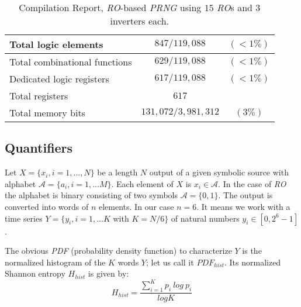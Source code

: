 \begin{table}
\begin{center}
\begin{tabular}{| l | c  c | }
 \hline
 
\footnotesize{Total logic elements} & $847/119,088$ & $ ( < 1 \%)$\\

 \hline
 
\footnotesize{Total combinational functions} &  $629/119,088$ & $( < 1 \%)$ \\

 \hline
 
\footnotesize{Dedicated logic registers} & $617/119,088$ & $( < 1 \%)$ \\

 \hline
 
\footnotesize{Total registers} &  $617$ &   \\

 \hline
 
\footnotesize{Total memory bits} &  $131,072/3,981,312$ & $( 3 \%)$ \\

 \hline
 
\end{tabular}
\end{center}
\caption{Compilation Report, \emph{RO}-based \emph{PRNG} using $15$ \emph{RO}s and $3$ inverters each.}
\label{compilation}

\end{table}







\subsection{Quantifiers}
\label{sec:method}
Let $X=\{x_i, i=1,...,N\}$ be a length $N$  output of a given
symbolic source with alphabet $\mathcal{A}=\{a_i,i=1,...M\}$. Each
element of $X$ is  $x_i \in \mathcal{A}$. In the case of \emph{RO}
the alphabet is binary consisting of two symbols
$\mathcal{A}=\{0,1\}$. The output is converted into words of $n$
elements. In our case $n=6$. It means we work with a time series
$Y=\{y_i,i=1,...K$ with $K=N/6\}$  of natural numbers $y_i\in [0,2^6-1]$.

The obvious \emph{PDF} (probability density function) to characterize $Y$ is the normalized histogram of the $K$
words $Y$; let us call it  $PDF_{hist}$. Its normalized Shannon
entropy $H_{hist}$ is given by:
\begin{equation}
\label{eq:entropia}
H_{hist}=\frac{\sum_{i=1}^{K}{p_i~log~p_i}}{logK}
\end{equation}

